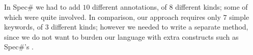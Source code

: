 In Spec\# we had to add $10$ different annotations, of $8$ different kinds; some of which were quite involved. In comparison, our approach requires only $7$ simple keywords, of $3$ different kinds; however we needed to write 
a separate \Q@moveTo@ method, since we do not want to burden our language with extra constructs such as Spec\#'s \Q@expose@.

%

